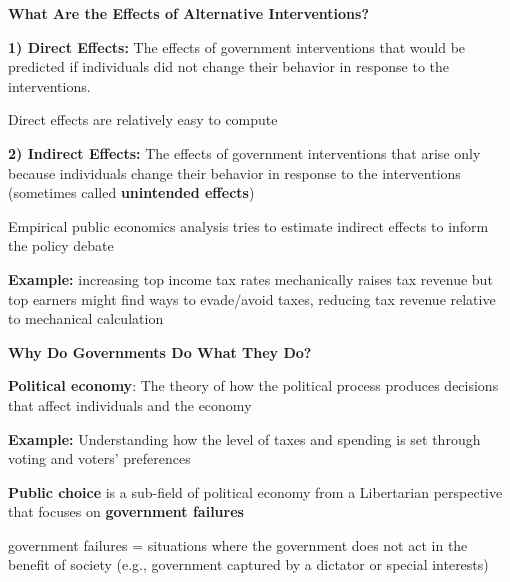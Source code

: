 \documentclass[landscape]{slides}
\begin{document}
\begin{slide}
\begin{center}
{\bf What Are the Effects of Alternative Interventions?}
\end{center}

{\bf 1) Direct Effects:} The effects of government interventions that would be predicted if individuals did not change their behavior in response to the interventions.

Direct effects are relatively easy to compute

{\bf 2) Indirect Effects:} The effects of government interventions that arise only because individuals change their behavior in
response to the interventions (sometimes called \textbf{unintended effects})

Empirical public economics analysis tries to estimate indirect effects to inform the policy debate

\textbf{Example:} increasing top income tax rates mechanically raises tax revenue but top earners might find ways to evade/avoid taxes, reducing tax revenue relative to mechanical calculation



\end{slide}

%

\begin{slide}
\begin{center}
{\bf Why Do Governments Do What They Do?}
\end{center}

{\bf Political economy}:
The theory of how the political process produces decisions that affect individuals and the economy

\textbf{Example:} Understanding how the level of taxes and spending is set through voting and voters'
preferences

\textbf{Public choice} is a sub-field of political economy from a Libertarian perspective that focuses on \textbf{government
failures} 

government failures = situations where the government does not act in the benefit of society
(e.g., government captured by a dictator or special interests)

\end{slide}
\end{document}

